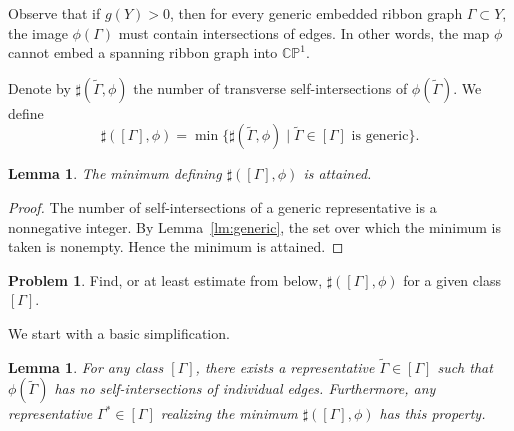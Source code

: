 \documentclass[reqno]{amsart}
\newtheorem{lemma}[theorem]{Lemma}
\theoremstyle{definition}
\newtheorem{problem}[theorem]{Problem}
\newcommand {\Ga}{\Gamma}
\newcommand {\bCP} {\mathbb {CP}}
\begin{document}
\smallskip
Observe that if $g(Y)>0$, then for every generic embedded ribbon graph $\Ga\subset Y$, the image $\phi(\Ga)$ must contain intersections of edges. In other words, the map $\phi$ cannot embed a spanning ribbon graph into $\bCP^1$.

Denote by $\sharp(\widetilde \Ga,\phi)$ the number of transverse self-intersections of $\phi(\widetilde \Ga)$. 
We define
\[
\sharp([\Gamma],\phi)
=
\min\{\sharp(\widetilde\Gamma,\phi) \mid \widetilde\Gamma\in[\Gamma] \text{ is generic}\}.
\]

\begin{lemma}\label{lm:minattained}
The minimum defining $\sharp([\Gamma],\phi)$ is attained.
\end{lemma}

\begin{proof}
The number of self-intersections of a generic representative is a nonnegative integer. By Lemma~\ref{lm:generic}, the set over which the minimum is taken is nonempty. Hence the minimum is attained.
\end{proof}

\begin{problem}
Find, or at least estimate from below, $\sharp([\Ga],\phi)$ for a given class $[\Ga]$.
\end{problem}

We start with a basic simplification.

\begin{lemma}\label{lm:noselfint}
For any class $[\Ga]$, there exists a representative $\widetilde \Ga\in[\Ga]$ such that $\phi(\widetilde \Ga)$ has no self-intersections of individual edges. Furthermore, any representative $\Ga^*\in[\Ga]$ realizing the minimum $\sharp([\Ga],\phi)$ has this property.
\end{lemma}
\end{document}
